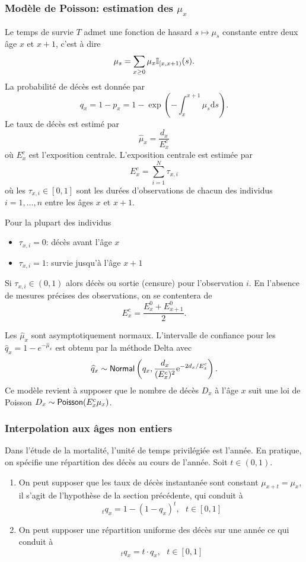 \subsubsection{Modèle de Poisson: estimation des $\mu_x$}
Le temps de survie $T$   admet une fonction de hasard $s\mapsto \mu_s$ constante entre deux âge $x$ et $x+1$, c'est à dire 
$$
\mu_s = \sum_{x\geq 0}\mu_x\mathbb{I}_{[x,x+1)}(s).
$$
La probabilité de décès est donnée par
$$
q_x = 1-p_x = 1-\exp\left(-\int_{x}^{x+1}\mu_s\text{d}s\right).
$$
Le taux de décès est estimé par 
$$
\widehat{\mu}_x = \frac{d_x}{E_x^c}
$$
où $E_x^c$ est l'exposition centrale. L'exposition centrale est estimée par 
$$
E_{x}^c = \sum_{i=1}^N\tau_{x,i}
$$
où les $\tau_{x,i}\in[0,1]$ sont les durées d'observations de chacun des individus $i=1,\ldots, n$ entre les âges $x$ et $x+1$. 
\begin{remark}
Pour la plupart des individus
\begin{itemize}
  \item $\tau_{x,i}=0$: décès avant l'âge $x$
  \item  $\tau_{x,i}=1$: survie jusqu'à l'âge $x+1$
\end{itemize}
Si $\tau_{x,i}\in (0,1)$ alors décès ou sortie (censure) pour l'observation $i$. En l'absence de mesures précises des observations, on se contentera de 
$$
E_{x}^c = \frac{E^0_{x}+E^0_{x+1}}{2}.
$$
\end{remark}
Les $\widehat{\mu}_x$ sont asymptotiquement normaux. L'intervalle de confiance pour les $\widehat{q}_x = 1 - e^{-\widehat{\mu}_x}$ est obtenu par la méthode Delta avec 
$$
\widehat{q}_x \sim \mathsf{Normal}\left( q_x, \frac{d_x}{(E_x^c)^2}\mathrm{e}^{- 2 d_x/E_x^c}\right).
$$
Ce modèle revient à supposer que le nombre de décès $D_x$ à l'âge $x$ suit une loi de Poisson $D_x\sim\mathsf{Poisson}(E_x^c\mu_x)$. 

\subsubsection{Interpolation aux âges non entiers}
Dans l'étude de la mortalité, l'unité de temps privilégiée est l'année. En pratique, on spécifie une répartition des décès au cours de l'année. Soit $t\in(0,1)$.
\begin{enumerate}
  \item On peut supposer que les taux de décès instantanée sont constant $\mu_{x+t} = \mu_x$, il s'agit de l'hypothèse de la section précédente, qui conduit à 
  $$
\,_tq_{x} =1- (1-q_x)^t,\text{ }t\in[0,1]
  $$
  \item On peut supposer une répartition uniforme des décès sur une année ce qui conduit à 
  $$
  \,_tq_x = t\cdot q_x,\text{ }t\in[0,1]
  $$
\end{enumerate}

